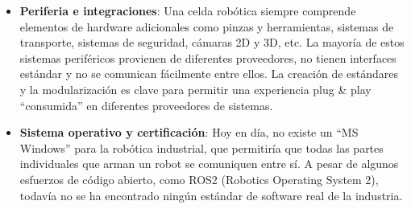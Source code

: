 \newpage

    \begin{itemize}
        \item{ \textbf{Periferia e integraciones}: Una celda robótica siempre comprende elementos de hardware adicionales como pinzas y herramientas, sistemas de transporte, sistemas de seguridad, cámaras 2D y 3D, etc. La mayoría de estos sistemas periféricos provienen de diferentes proveedores, no tienen interfaces estándar y no se comunican fácilmente entre ellos. La creación de estándares y la modularización es clave para permitir una experiencia plug \& play ``consumida'' en diferentes proveedores de sistemas.}
        \item{ \textbf{Sistema operativo y certificación}: Hoy en día, no existe un ``MS Windows'' para la robótica industrial, que permitiría que todas las partes individuales que arman un robot se comuniquen entre sí. A pesar de algunos esfuerzos de código abierto, como ROS2 (Robotics Operating System 2), todavía no se ha encontrado ningún estándar de software real de la industria.}
    \end{itemize}
